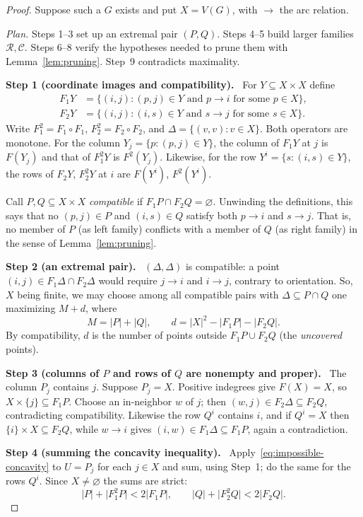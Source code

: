 \documentclass[11pt]{article}
\theoremstyle{remark}
\newcommand{\abs}[1]{\lvert #1\rvert}
\newcommand{\step}[1]{\par\medskip\noindent\textbf{Step #1.}\ }
\begin{document}
\begin{proof}
Suppose such a $G$ exists and put $X=V(G)$, with $\to$ the arc relation.

\emph{Plan.} Steps 1--3 set up an extremal pair $(P,Q)$. Steps 4--5 build
larger families $\mathcal R,\mathcal C$. Steps 6--8 verify the hypotheses
needed to prune them with Lemma~\ref{lem:pruning}. Step~9 contradicts
maximality.

\step{1 (coordinate images and compatibility)}
For $Y\subseteq X\times X$ define
\[
 \begin{aligned}
 F_1Y&=\{(i,j): (p,j)\in Y\text{ and }p\to i
                     \text{ for some }p\in X\},\\
 F_2Y&=\{(i,j): (i,s)\in Y\text{ and }s\to j
                     \text{ for some }s\in X\}.
 \end{aligned}
\]
Write $F_1^2=F_1\circ F_1$, $F_2^2=F_2\circ F_2$, and
$\Delta=\{(v,v):v\in X\}$. Both operators are monotone. For the column
$Y_j=\{p:(p,j)\in Y\}$, the column of $F_1Y$ at $j$ is $F(Y_j)$ and that of
$F_1^2Y$ is $F^2(Y_j)$. Likewise, for the row $Y^i=\{s:(i,s)\in Y\}$, the
rows of $F_2Y$, $F_2^2Y$ at $i$ are $F(Y^i)$, $F^2(Y^i)$.

Call $P,Q\subseteq X\times X$ \emph{compatible} if
$F_1P\cap F_2Q=\varnothing$. Unwinding the definitions, this says that no
$(p,j)\in P$ and $(i,s)\in Q$ satisfy both $p\to i$ and $s\to j$. That is,
no member of $P$ (as left family) conflicts with a member of $Q$ (as right
family) in the sense of Lemma~\ref{lem:pruning}.

\step{2 (an extremal pair)}
$(\Delta,\Delta)$ is compatible: a point $(i,j)\in F_1\Delta\cap F_2\Delta$
would require $j\to i$ and $i\to j$, contrary to orientation. So, $X$ being
finite, we may choose among all compatible pairs with
$\Delta\subseteq P\cap Q$ one maximizing $M+d$, where
\[
 M=\abs{P}+\abs{Q},\qquad
 d=\abs{X}^2-\abs{F_1P}-\abs{F_2Q}.
\]
By compatibility, $d$ is the number of points outside $F_1P\cup F_2Q$
(the \emph{uncovered} points).

\step{3 (columns of $P$ and rows of $Q$ are nonempty and proper)}
The column $P_j$ contains $j$. Suppose $P_j=X$. Positive indegrees give
$F(X)=X$, so $X\times\{j\}\subseteq F_1P$. Choose an in-neighbor $w$ of $j$;
then $(w,j)\in F_2\Delta\subseteq F_2Q$, contradicting compatibility.
Likewise the row $Q^i$ contains $i$, and if $Q^i=X$ then
$\{i\}\times X\subseteq F_2Q$, while $w\to i$ gives
$(i,w)\in F_1\Delta\subseteq F_1P$, again a contradiction.

\step{4 (summing the concavity inequality)}
Apply~\eqref{eq:impossible-concavity} to $U=P_j$ for each $j\in X$ and sum,
using Step~1; do the same for the rows $Q^i$. Since $X\neq\varnothing$ the
sums are strict:
\begin{equation}\label{eq:strict-fiber-sums}
 \abs{P}+\abs{F_1^2P}<2\abs{F_1P},\qquad
 \abs{Q}+\abs{F_2^2Q}<2\abs{F_2Q}.
\end{equation}


\end{proof}
\end{document}

